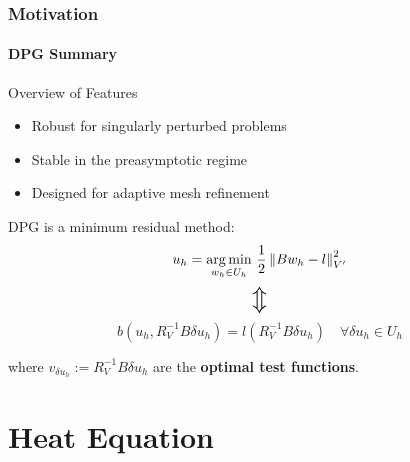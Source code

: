 \documentclass[18pt,xcolor=table]{beamer}
\begin{document}

\begin{frame}[t]
\frametitle{Motivation}
\framesubtitle{DPG Summary}  %
Overview of Features
\begin{itemize}
\item Robust for singularly perturbed problems
\item Stable in the preasymptotic regime
\item Designed for adaptive mesh refinement
\end{itemize}
\bigskip

DPG is a minimum residual method:
\[
u_{h} = \underset{w_{h} \in U_{h}} {\operatorname*{arg\,min}} \,\, \frac{1}{2}
\left\| Bw_{h}-l \right\|_{V'}^{2}
\]
\vspace{-1em}
\[
\scalebox{1.8}{\ensuremath{\Updownarrow}}
\]
\vspace{-1em}
\[
b(u_h,R_V^{-1}B\delta u_h)
=l(R_V^{-1}B\delta u_h)
\quad\forall\delta u_h\in U_h
\]
\vspace{-2ex}

where $v_{\delta u_h}:=R_V^{-1}B\delta u_h$ are the
\textcolor{utblack}{\textbf{optimal test functions}}.

\end{frame}

%                                          
%                                          
%  
\section{Heat Equation}
\end{document}
